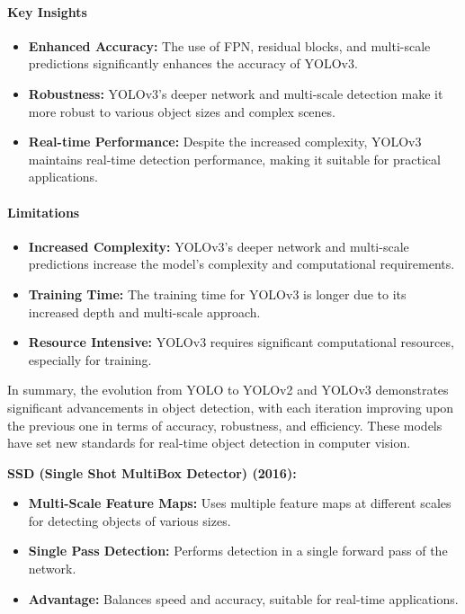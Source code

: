 \documentclass[12pt]{article}
\begin{document}
\paragraph{Key Insights}

\begin{itemize}
    \item \textbf{Enhanced Accuracy:} The use of FPN, residual blocks, and multi-scale predictions significantly enhances the accuracy of YOLOv3.

    \item \textbf{Robustness:} YOLOv3's deeper network and multi-scale detection make it more robust to various object sizes and complex scenes.

    \item \textbf{Real-time Performance:} Despite the increased complexity, YOLOv3 maintains real-time detection performance, making it suitable for practical applications.
\end{itemize}

\paragraph{Limitations}

\begin{itemize}
    \item \textbf{Increased Complexity:} YOLOv3's deeper network and multi-scale predictions increase the model's complexity and computational requirements.
    
    \item \textbf{Training Time:} The training time for YOLOv3 is longer due to its increased depth and multi-scale approach.
    
    \item \textbf{Resource Intensive:} YOLOv3 requires significant computational resources, especially for training.
\end{itemize}

In summary, the evolution from YOLO to YOLOv2 and YOLOv3 demonstrates significant advancements in object detection, with each iteration improving upon the previous one in terms of accuracy, robustness, and efficiency. These models have set new standards for real-time object detection in computer vision.

\textbf{SSD (Single Shot MultiBox Detector) (2016):}
\begin{itemize}
    \item \textbf{Multi-Scale Feature Maps:} Uses multiple feature maps at different scales for detecting objects of various sizes.
    \item \textbf{Single Pass Detection:} Performs detection in a single forward pass of the network.
    \item \textbf{Advantage:} Balances speed and accuracy, suitable for real-time applications.
\end{itemize}
\end{document}
